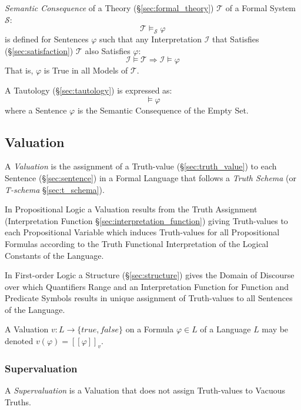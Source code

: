 \emph{Semantic Consequence} of a Theory (\S\ref{sec:formal_theory})
$\mathcal{T}$ of a Formal System $\mathcal{S}$:
\[
  \mathcal{T} \vDash_{\mathcal{S}} \varphi
\]
is defined for Sentences $\varphi$ such that any Interpretation
$\mathcal{I}$ that Satisfies (\S\ref{sec:satisfaction}) $\mathcal{T}$
also Satisfies $\varphi$:
\[
  \mathcal{I} \models \mathcal{T}
  \Rightarrow \mathcal{I} \models \varphi
\]
That is, $\varphi$ is True in all Models of $\mathcal{T}$.

A Tautology (\S\ref{sec:tautology}) is expressed as:
\[
    \vDash {\varphi}
\]
where a Sentence $\varphi$ is the Semantic Consequence of the Empty
Set.



\subsection{Valuation}\label{sec:valuation}

A \emph{Valuation} is the assignment of a Truth-value
(\S\ref{sec:truth_value}) to each Sentence (\S\ref{sec:sentence}) in a
Formal Language that follows a \emph{Truth Schema} (or \emph{T-schema}
\S\ref{sec:t_schema}).

In Propositional Logic a Valuation results from the Truth Assignment
(Interpretation Function \S\ref{sec:interpretation_function}) giving
Truth-values to each Propositional Variable which induces Truth-values
for all Propositional Formulas according to the Truth Functional
Interpretation of the Logical Constants of the Language.

In First-order Logic a Structure (\S\ref{sec:structure}) gives the
Domain of Discourse over which Quantifiers Range and an Interpretation
Function for Function and Predicate Symbols results in unique
assignment of Truth-values to all Sentences of the Language.

A Valuation $v : L \rightarrow \{true, false\}$ on a Formula $\varphi
\in L$ of a Language $L$ may be denoted $v(\varphi) = [[\varphi]]_v$.



\subsubsection{Supervaluation}\label{sec:supervaluation}

A \emph{Supervaluation} is a Valuation that does not assign
Truth-values to Vacuous Truths.

